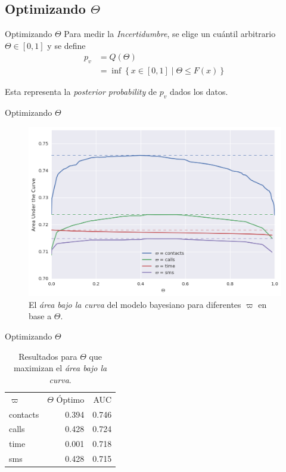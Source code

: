 \documentclass{beamer}
\begin{document}
\subsection{Optimizando $\Theta$}

\begin{frame}{Optimizando $\Theta$}
	Para medir la \emph{Incertidumbre}, se elige un cuántil arbitrario $\Theta \in \left[ 0, 1 \right]$ y se define
	\begin{align*}
		p_v &= Q \left( \Theta \right) \\
		&= \inf \left\{ x \in \left[ 0, 1 \right] \mid \Theta \leq F \left( x \right) \right\}
	\end{align*}

	Esta representa la \emph{posterior probability} de $p_v$ dados los datos.
\end{frame}

\begin{frame}{Optimizando $\Theta$}
	\begin{figure}
		\includegraphics[height=.75\textheight]{theta.png}
		\caption{El \emph{área bajo la curva} del modelo bayesiano para diferentes $\varpi$ en base a $\Theta$.}
	\end{figure}
\end{frame}

\begin{frame}{Optimizando $\Theta$}
	\begin{table}
		\centering
		\begin{tabular}{l r r}
			$\varpi$ & $\Theta$ Óptimo & AUC \\
			contacts & \num{0.394} & \num{0.746} \\
			calls & \num{0.428} & \num{0.724} \\
			time & \num{0.001} & \num{0.718} \\
			sms & \num{0.428} & \num{0.715}
		\end{tabular}
		\caption{Resultados para $\Theta$ que maximizan el \emph{área bajo la curva}.}
	\end{table}
\end{frame}
\end{document}
